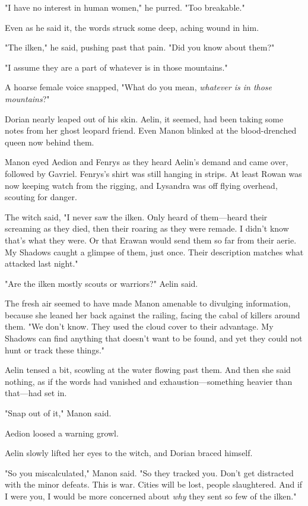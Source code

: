 "I have no interest in human women," he purred. "Too breakable."

Even as he said it, the words struck some deep, aching wound in him.

"The ilken," he said, pushing past that pain. "Did you know about them?"

"I assume they are a part of whatever is in those mountains."

A hoarse female voice snapped, "What do you mean, \emph{whatever is in those mountains}?"

Dorian nearly leaped out of his skin. Aelin, it seemed, had been taking some notes from her ghost leopard friend. Even Manon blinked at the blood-drenched queen now behind them.

Manon eyed Aedion and Fenrys as they heard Aelin's demand and came over, followed by Gavriel. Fenrys's shirt was still hanging in strips. At least Rowan was now keeping watch from the rigging, and Lysandra was off flying overhead, scouting for danger.

The witch said, "I never saw the ilken. Only heard of them---heard their screaming as they died, then their roaring as they were remade. I didn't know that's what they were. Or that Erawan would send them so far from their aerie. My Shadows caught a glimpse of them, just once. Their description matches what attacked last night."

"Are the ilken mostly scouts or warriors?" Aelin said.

The fresh air seemed to have made Manon amenable to divulging information, because she leaned her back against the railing, facing the cabal of killers around them. "We don't know. They used the cloud cover to their advantage. My Shadows can find anything that doesn't want to be found, and yet they could not hunt or track these things."

Aelin tensed a bit, scowling at the water flowing past them. And then she said nothing, as if the words had vanished and exhaustion---something heavier than that---had set in.

"Snap out of it," Manon said.

Aedion loosed a warning growl.

Aelin slowly lifted her eyes to the witch, and Dorian braced himself.

"So you miscalculated," Manon said. "So they tracked you. Don't get distracted with the minor defeats. This is war. Cities will be lost, people slaughtered. And if I were you, I would be more concerned about
\emph{why} they sent so few of the ilken."

